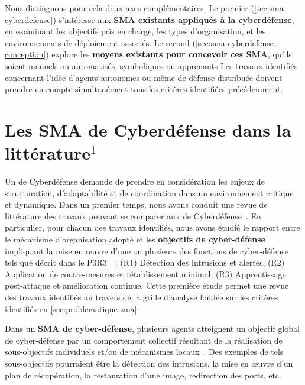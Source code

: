 Nous distinguons pour cela deux axes complémentaires. Le premier (\autoref{sec:sma-cyberdefense}) s’intéresse aux \textbf{SMA existants appliqués à la cyberdéfense}, en examinant les objectifs pris en charge, les types d’organisation, et les environnements de déploiement associés. Le second (\autoref{sec:sma-cyberdefense-conception}) explore les \textbf{moyens existants pour concevoir ces SMA}, qu’ils soient manuels ou automatisés, symboliques ou apprenants
%
Les travaux identifiés concernant l'idée d'agents autonomes ou même de défense distribuée doivent prendre en compte simultanément tous les critères identifiées précédemment.


\section{Les SMA de Cyberdéfense dans la littérature$^{1}$}\label{sec:sma-cyberdefense}


Un  de Cyberdéfense demande de prendre en considération les enjeux de structuration, d'adaptabilité et de coordination dans un environnement critique et dynamique.
Dans un premier temps, nous avons conduit une revue de littérature des travaux pouvant se comparer aux  de Cyberdéfense~\cite{soule2023ressithese}.
En particulier, pour chacun des travaux identifiés, nous avons étudié le rapport entre le mécanisme d'organisation adopté et les \textbf{objectifs de cyber-défense} impliquant la mise en œuvre d'une ou plusieurs des fonctions de cyber-défense tels que décrit dans le P3R3~\cite{Theron2013P3R3}~:
(R1) Détection des intrusions et alertes,
(R2) Application de contre-mesures et rétablissement minimal,
(R3) Apprentissage post-attaque et amélioration continue.
Cette première étude permet une revue des travaux identifiés au travers de la grille d'analyse fondée sur les critères identifiés en \autoref{sec:problematique-sma}.

Dans un \textbf{SMA de cyber-défense}, plusieurs agents atteignent un objectif global de cyber-défense par un comportement collectif résultant de la réalisation de sous-objectifs individuels et/ou de mécanismes locaux~\cite{jamont2015meeting}.
Des exemples de tels sous-objectifs pourraient être la détection des intrusions, la mise en œuvre d'un plan de récupération, la restauration d'une image, redirection des ports, etc.



